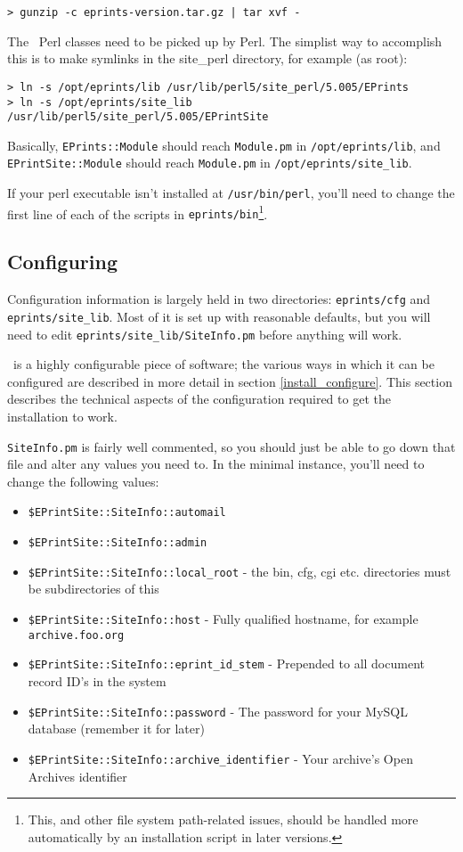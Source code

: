 \begin{verbatim}
> gunzip -c eprints-version.tar.gz | tar xvf -
\end{verbatim}

The \eprints\ Perl classes need to be picked up by Perl. The simplist way to accomplish this is to make symlinks in the site\_perl directory, for example (as root):

\begin{verbatim}
> ln -s /opt/eprints/lib /usr/lib/perl5/site_perl/5.005/EPrints
> ln -s /opt/eprints/site_lib
/usr/lib/perl5/site_perl/5.005/EPrintSite
\end{verbatim}

Basically, {\tt EPrints::Module} should reach {\tt Module.pm} in {\tt /opt/eprints/lib}, and {\tt EPrintSite::Module} should reach {\tt Module.pm} in {\tt /opt/eprints/site\_lib}.

If your perl executable isn't installed at {\tt /usr/bin/perl}, you'll need to change the first line of each of the scripts in {\tt eprints/bin}\footnote{This, and other file system path-related issues, should be handled more automatically by an installation script in later versions.}.


\subsection{Configuring \eprints}

Configuration information is largely held in two directories: {\tt eprints/cfg} and {\tt eprints/site\_lib}. Most of it is set up with reasonable defaults, but you will need to edit {\tt eprints/site\_lib/SiteInfo.pm} before anything will work.

\eprints\ is a highly configurable piece of software; the various ways in which it can be configured are described in more detail in section \ref{install_configure}. This section describes the technical aspects of the configuration required to get the installation to work.

{\tt SiteInfo.pm} is fairly well commented, so you should just be able to go down that file and alter any values you need to. In the minimal instance, you'll need to change the following values:

\begin{itemize}
\item {\tt \$EPrintSite::SiteInfo::automail}
\item {\tt \$EPrintSite::SiteInfo::admin}
\item {\tt \$EPrintSite::SiteInfo::local\_root} - the bin, cfg, cgi etc. directories must be subdirectories of this
\item {\tt \$EPrintSite::SiteInfo::host} - Fully qualified hostname, for example {\tt archive.foo.org}
\item {\tt \$EPrintSite::SiteInfo::eprint\_id\_stem} - Prepended to all document record ID's in the system
\item {\tt \$EPrintSite::SiteInfo::password} - The password for your MySQL database (remember it for later)
\item {\tt \$EPrintSite::SiteInfo::archive\_identifier} - Your archive's Open Archives identifier
\end{itemize}

